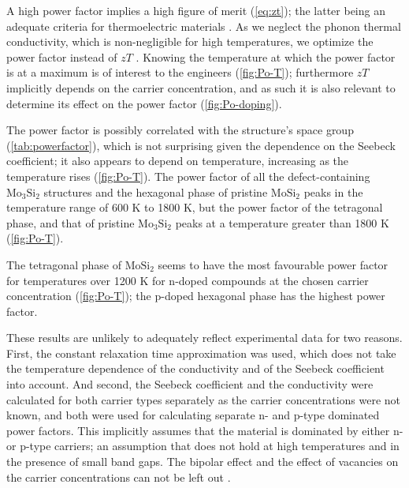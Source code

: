 \documentclass[7.5pt]{article}
\theoremstyle{plain}
\theoremstyle{definition}
\newcommand{\<}{\langle}
\renewcommand{\>}{\rangle}
\begin{document}
\begin{multicols}{2}

\noindent A high power factor implies a high figure of merit (\autoref{eq:zt}); the latter being an adequate criteria for thermoelectric materials \cite{alma9939162912205131}.
As we neglect the phonon thermal conductivity, which is non-negligible for high temperatures, we optimize the power factor instead of $zT$ \cite{ZhuTiejun2016NIiI}.
Knowing the temperature at which the power factor is at a maximum is of interest to the engineers (\autoref{fig:Po-T}); furthermore $zT$ implicitly depends on the carrier concentration, and as such it is also relevant to determine its effect on the power factor (\autoref{fig:Po-doping}).

The power factor is possibly correlated with the structure's space group (\autoref{tab:powerfactor}), which is not surprising given the dependence on the Seebeck coefficient; it also appears to depend on temperature, increasing as the temperature rises (\autoref{fig:Po-T}).
The power factor of all the defect-containing $\text{Mo}_3\text{Si}_2$ structures and the hexagonal phase of pristine $\text{MoSi}_2$ peaks in the temperature range of 600 K to 1800 K, but the power factor of the tetragonal phase, and that of pristine $\text{Mo}_3\text{Si}_2$ peaks at a temperature greater than 1800 K (\autoref{fig:Po-T}).

The tetragonal phase of $\text{Mo}\text{Si}_{2}$ seems to have the most favourable power factor for temperatures over 1200 K for n-doped compounds at the chosen carrier concentration (\autoref{fig:Po-T}); the p-doped hexagonal phase has the highest power factor. 

These results are unlikely to adequately reflect experimental data for two reasons. 
First, the constant relaxation time approximation was used, which does not take the temperature dependence of the conductivity and of the Seebeck coefficient into account.
And second, the Seebeck coefficient and the conductivity were calculated for both carrier types separately as the carrier concentrations were not known, and both were used for calculating separate n- and p-type dominated power factors.
This implicitly assumes that the material is dominated by either n- or p-type carriers; an assumption that does not hold at high temperatures and in the presence of small band gaps. 
The bipolar effect and the effect of vacancies on the carrier concentrations can not be left out \cite{cdi_proquest_reports_1030752835}.



\end{multicols}
\end{document}
